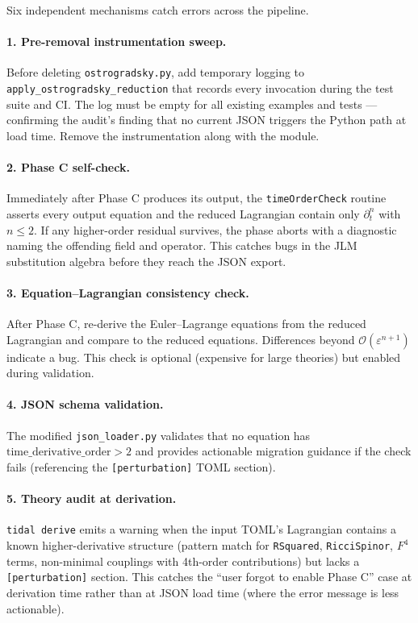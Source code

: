 Six independent mechanisms catch errors across the pipeline.

\paragraph{1. Pre-removal instrumentation sweep.} Before deleting \texttt{ostrogradsky.py}, add temporary logging to \texttt{apply\_ostrogradsky\_reduction} that records every invocation during the test suite and CI. The log must be empty for all existing examples and tests --- confirming the audit's finding that no current JSON triggers the Python path at load time. Remove the instrumentation along with the module.

\paragraph{2. Phase C self-check.} Immediately after Phase C produces its output, the \texttt{timeOrderCheck} routine asserts every output equation and the reduced Lagrangian contain only $\partial_t^n$ with $n \leq 2$. If any higher-order residual survives, the phase aborts with a diagnostic naming the offending field and operator. This catches bugs in the JLM substitution algebra before they reach the JSON export.

\paragraph{3. Equation--Lagrangian consistency check.} After Phase C, re-derive the Euler--Lagrange equations from the reduced Lagrangian and compare to the reduced equations. Differences beyond $\mathcal{O}(\varepsilon^{n+1})$ indicate a bug. This check is optional (expensive for large theories) but enabled during validation.

\paragraph{4. JSON schema validation.} The modified \texttt{json\_loader.py} validates that no equation has $\mathrm{time\_derivative\_order} > 2$ and provides actionable migration guidance if the check fails (referencing the \texttt{[perturbation]} TOML section).

\paragraph{5. Theory audit at derivation.} \texttt{tidal derive} emits a warning when the input TOML's Lagrangian contains a known higher-derivative structure (pattern match for \texttt{RSquared}, \texttt{RicciSpinor}, $F^4$ terms, non-minimal couplings with 4th-order contributions) but lacks a \texttt{[perturbation]} section. This catches the ``user forgot to enable Phase C'' case at derivation time rather than at JSON load time (where the error message is less actionable).


